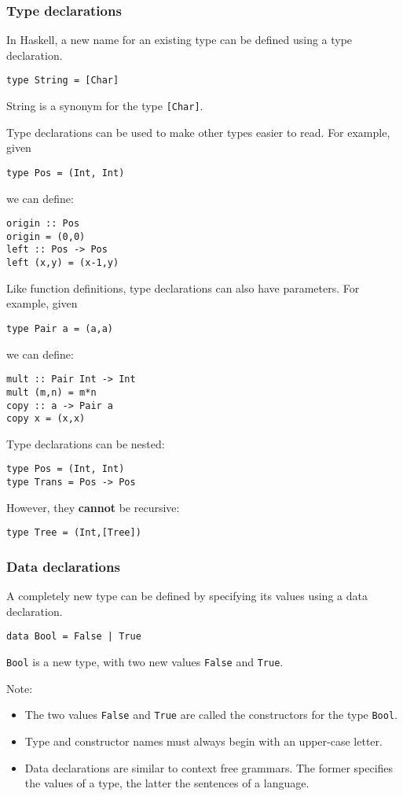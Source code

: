 \begin{multicols}{2}
\subsubsection{Type declarations}
In Haskell, a new name for an existing type can be defined using a type declaration.
\begin{lstlisting}
type String = [Char]
\end{lstlisting}
String is a synonym for the type \lstinline{[Char]}.

Type declarations can be used to make other types easier to read.
For example, given
\begin{lstlisting}
type Pos = (Int, Int)
\end{lstlisting}
we can define:
\begin{lstlisting}
origin :: Pos
origin = (0,0)
left :: Pos -> Pos
left (x,y) = (x-1,y)
\end{lstlisting}

Like function definitions, type declarations can also have parameters.
For example, given
\begin{lstlisting}
type Pair a = (a,a)
\end{lstlisting}
we can define:
\begin{lstlisting}
mult :: Pair Int -> Int
mult (m,n) = m*n
copy :: a -> Pair a
copy x = (x,x)
\end{lstlisting}

Type declarations can be nested:
\begin{lstlisting}[frame=single,rulecolor=\color{green}]
type Pos = (Int, Int)
type Trans = Pos -> Pos
\end{lstlisting}

However, they \textbf{cannot} be recursive:
\begin{lstlisting}[frame=single,rulecolor=\color{red}]
type Tree = (Int,[Tree])
\end{lstlisting}

\subsubsection{Data declarations}
A completely new type can be defined by specifying its values using a data declaration.
\begin{lstlisting}
data Bool = False | True
\end{lstlisting}
\lstinline{Bool} is a new type, with two new values \lstinline{False} and \lstinline{True}.

Note:
\begin{itemize}
  \item The two values \lstinline{False} and \lstinline{True} are called the constructors for the type \lstinline{Bool}.
  \item Type and constructor names must always begin with an upper-case letter.
  \item Data declarations are similar to context free grammars. The former specifies the values of a type, the latter the sentences of a language.
\end{itemize}


\end{multicols}

